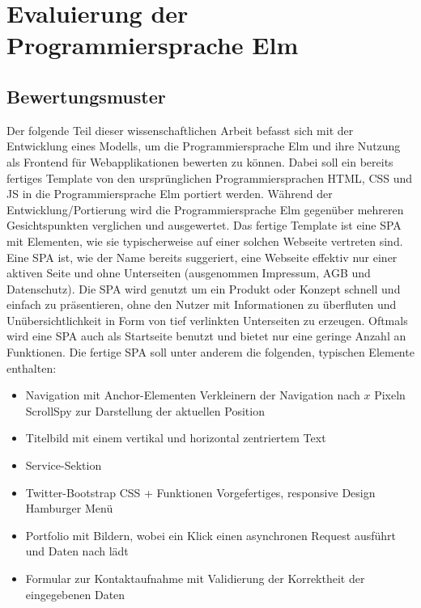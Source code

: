 \chapter{Evaluierung der Programmiersprache Elm}
\label{sec:Evaluierung der Programmiersprache Elm}
\pagestyle{plain}

\section{Bewertungsmuster}
\label{sec:Bewertungsmuster}
Der folgende Teil dieser wissenschaftlichen Arbeit befasst sich mit der Entwicklung eines Modells, um die Programmiersprache Elm und ihre Nutzung als Frontend für Webapplikationen bewerten zu können. Dabei soll ein bereits fertiges Template von den ursprünglichen Programmiersprachen \ac{HTML}, \ac{CSS} und \ac{JS} in die Programmiersprache Elm portiert werden. Während der Entwicklung/Portierung wird die Programmiersprache Elm gegenüber mehreren Gesichtspunkten verglichen und ausgewertet.
Das fertige Template ist eine \ac{SPA} mit Elementen, wie sie typischerweise auf einer solchen Webseite vertreten sind. Eine \ac{SPA} ist, wie der Name bereits suggeriert, eine Webseite effektiv nur einer aktiven Seite und ohne Unterseiten (ausgenommen Impressum, AGB und Datenschutz). Die \ac{SPA} wird genutzt um ein Produkt oder Konzept schnell und einfach zu präsentieren, ohne den Nutzer mit Informationen zu überfluten und Unübersichtlichkeit in Form von tief verlinkten Unterseiten zu erzeugen. Oftmals wird eine SPA auch als Startseite benutzt und bietet nur eine geringe Anzahl an Funktionen.
Die fertige \ac{SPA} soll unter anderem die folgenden, typischen Elemente enthalten:
\begin{itemize}
\item Navigation mit Anchor-Elementen
\subitem{-} Verkleinern der Navigation nach $x$ Pixeln
\subitem{-} ScrollSpy zur Darstellung der aktuellen Position
\item Titelbild mit einem vertikal und horizontal zentriertem Text
\item Service-Sektion
\item Twitter-Bootstrap CSS + Funktionen
\subitem{-} Vorgefertiges, responsive Design
\subitem{-} Hamburger Menü
\item Portfolio mit Bildern, wobei ein Klick einen asynchronen Request ausführt und Daten nach lädt
\item Formular zur Kontaktaufnahme mit Validierung der Korrektheit der eingegebenen Daten
\end{itemize}

